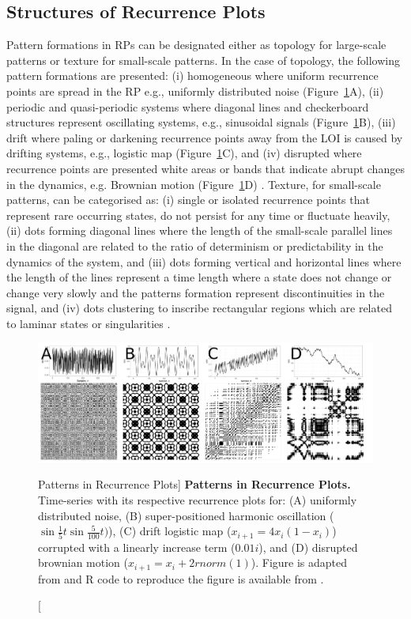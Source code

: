 \subsection{Structures of Recurrence Plots}
Pattern formations in RPs can be designated either 
as topology for large-scale patterns or texture for small-scale patterns.
In the case of topology, the following pattern formations are presented:
(i) homogeneous where uniform recurrence points are spread in the RP e.g., 
uniformly distributed noise (Figure~\ref{fig:rp2}A), 
(ii) periodic and quasi-periodic systems where diagonal lines and 
checkerboard structures represent oscillating systems, e.g., sinusoidal 
signals (Figure~\ref{fig:rp2}B), 
(iii) drift where paling or darkening recurrence points away from 
the LOI is caused by drifting systems, 
e.g., logistic map (Figure~\ref{fig:rp2}C), and
(iv) disrupted where recurrence points are presented white areas or 
bands that indicate abrupt changes in the dynamics, e.g. Brownian motion 
(Figure~\ref{fig:rp2}D) \citep{eckmann1987, marwan2015}.
Texture, for small-scale patterns, can be categorised as:
(i) single or isolated recurrence points that represent rare occurring 
states, do not persist for any time or fluctuate heavily,
(ii) dots forming diagonal lines where the length of the small-scale parallel 
lines in the diagonal are related to the ratio of determinism or 
predictability in the dynamics of the system, and
(iii) dots forming vertical and horizontal lines where the length of the 
lines represent a time length where a state does not change or change very 
slowly and the patterns formation represent discontinuities in the signal, and
(iv) dots clustering to inscribe rectangular regions which are related 
to laminar states or singularities \citep{marwan2015}.

\begin{figure}
  \centering
    \includegraphics[width=1.0\textwidth]{fig_3_06}
    \caption
	[Patterns in Recurrence Plots]{
	{\bf Patterns in Recurrence Plots.} 
	Time-series with its respective recurrence plots for:
	(A) uniformly distributed noise,
	(B) super-positioned harmonic oscillation 
	($\sin{ \frac{1}{5} t} \sin{ \frac{5}{100}t) }$),
	(C) drift logistic map ($x_{i+1} = 4 x_i (1- x_i) $) corrupted 
	with a linearly increase term ($0.01 i$), and
	(D) disrupted brownian motion  ($x_{i+1} = x_i + 2rnorm(1) $).
	Figure is adapted from \cite{marwan2015} and R code to reproduce 
	the figure is available from \cite{xochicale2018}.
	}
    \label{fig:rp2}
\end{figure}

